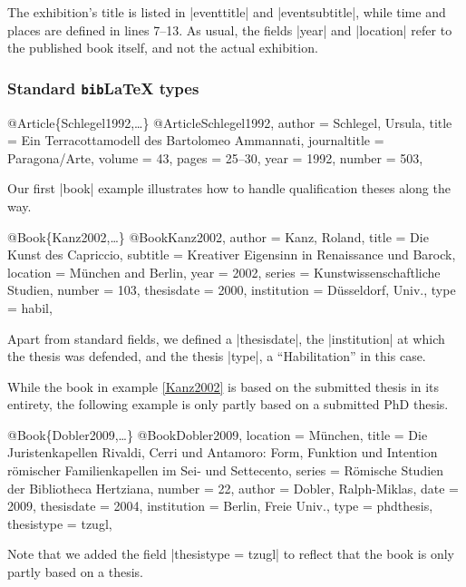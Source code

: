 \documentclass[a4paper,
10pt,
ngerman,
english
]{ltxdoc}
\begin{document}
The exhibition's title is listed in |eventtitle| and |eventsubtitle|, 
while time and places are defined in lines 7--13. 
As usual, the fields |year| and |location| refer to the published book itself, and not the actual exhibition.

\subsubsection{Standard \texttt{bib}\LaTeX{} types}

\begin{bibexample}[label=Schlegel1992]{{@}Article\{Schlegel1992,…\}}
@Article{Schlegel1992,
  author       = {Schlegel, Ursula},
  title        = {Ein Terracottamodell des Bartolomeo Ammannati},
  journaltitle = {Paragona/Arte},
  volume       = {43},
  pages        = {25--30},
  year         = {1992},
  number       = {503},
}
\end{bibexample}

Our first |book| example illustrates how to handle qualification theses along the way.
\begin{bibexample}[label=Kanz2002]{{@}Book\{Kanz2002,…\}}
@Book{Kanz2002,
  author      = {Kanz, Roland},
  title       = {Die Kunst des Capriccio},
  subtitle    = {Kreativer Eigensinn in Renaissance und Barock},
  location    = {München and Berlin},
  year        = {2002},
  series      = {Kunstwissenschaftliche Studien},
  number      = {103},
  thesisdate  = {2000},
  institution = {Düsseldorf, Univ.},
  type        = {habil},
}
\end{bibexample}
Apart from standard fields, we defined a |thesisdate|, the |institution| at which the thesis was defended, and the thesis |type|, a \foreignquote{ngerman}{Habilitation} in this case.

While the book in example \ref{Kanz2002} is based on the submitted thesis in its entirety, the following example is only partly based on a submitted PhD thesis.
\begin{bibexample}[label=Dobler2009]{{@}Book\{Dobler2009,…\}}
@Book{Dobler2009,
  location = {München},
  title = {Die Juristenkapellen Rivaldi, Cerri und Antamoro: Form, Funktion und Intention römischer Familienkapellen im Sei- und Settecento},
  series = {Römische Studien der Bibliotheca Hertziana},
  number = {22},
  author = {Dobler, Ralph-Miklas},
  date = {2009},
  thesisdate = {2004},
  institution = {Berlin, Freie Univ.},
  type = {phdthesis},
  thesistype = {tzugl},
}
\end{bibexample}
Note that we added the field |thesistype = {tzugl}| to reflect that the book is only partly based on a thesis.
\end{document}
